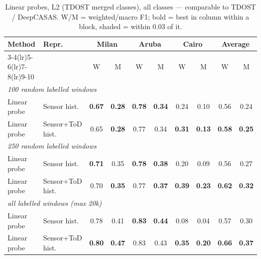 \begin{table}[H]
\centering\small
\caption{Linear probes, L2 (TDOST merged classes), all classes --- comparable to TDOST / DeepCASAS. W/M = weighted/macro F1; bold = best in column within a block, shaded = within 0.03 of it.}
\label{tab:probe_l2_all}
\setlength{\tabcolsep}{3.5pt}
\begin{tabular}{llcc|cc|cc|cc}
\toprule
Method & Repr. & \multicolumn{2}{c}{Milan} & \multicolumn{2}{c}{Aruba} & \multicolumn{2}{c}{Cairo} & \multicolumn{2}{c}{Average} \\
\cmidrule(lr){3-4}\cmidrule(lr){5-6}\cmidrule(lr){7-8}\cmidrule(lr){9-10}
 & & W & M & W & M & W & M & W & M \\
\midrule
\multicolumn{10}{l}{\textit{100 random labelled windows}} \\
\midrule
Linear probe & Sensor hist. & \cellcolor{blue!12}\textbf{0.67} & \cellcolor{blue!12}\textbf{0.28} & \cellcolor{blue!12}\textbf{0.78} & \cellcolor{blue!12}\textbf{0.34} & 0.24 & \cellcolor{blue!12}0.10 & \cellcolor{blue!12}0.56 & \cellcolor{blue!12}0.24 \\
Linear probe & Sensor+ToD hist. & \cellcolor{blue!12}0.65 & \cellcolor{blue!12}\textbf{0.28} & \cellcolor{blue!12}0.77 & \cellcolor{blue!12}0.34 & \cellcolor{blue!12}\textbf{0.31} & \cellcolor{blue!12}\textbf{0.13} & \cellcolor{blue!12}\textbf{0.58} & \cellcolor{blue!12}\textbf{0.25} \\
\midrule
\multicolumn{10}{l}{\textit{250 random labelled windows}} \\
\midrule
Linear probe & Sensor hist. & \cellcolor{blue!12}\textbf{0.71} & \cellcolor{blue!12}0.35 & \cellcolor{blue!12}\textbf{0.78} & \cellcolor{blue!12}\textbf{0.38} & 0.20 & 0.09 & 0.56 & 0.27 \\
Linear probe & Sensor+ToD hist. & \cellcolor{blue!12}0.70 & \cellcolor{blue!12}\textbf{0.35} & \cellcolor{blue!12}0.77 & \cellcolor{blue!12}\textbf{0.37} & \cellcolor{blue!12}\textbf{0.39} & \cellcolor{blue!12}\textbf{0.23} & \cellcolor{blue!12}\textbf{0.62} & \cellcolor{blue!12}\textbf{0.32} \\
\midrule
\multicolumn{10}{l}{\textit{all labelled windows (max 20k)}} \\
\midrule
Linear probe & Sensor hist. & \cellcolor{blue!12}0.78 & 0.41 & \cellcolor{blue!12}\textbf{0.83} & \cellcolor{blue!12}\textbf{0.44} & 0.08 & 0.04 & 0.57 & 0.30 \\
Linear probe & Sensor+ToD hist. & \cellcolor{blue!12}\textbf{0.80} & \cellcolor{blue!12}\textbf{0.47} & \cellcolor{blue!12}0.83 & \cellcolor{blue!12}0.43 & \cellcolor{blue!12}\textbf{0.35} & \cellcolor{blue!12}\textbf{0.20} & \cellcolor{blue!12}\textbf{0.66} & \cellcolor{blue!12}\textbf{0.37} \\
\bottomrule
\end{tabular}
\end{table}
